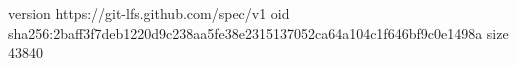 version https://git-lfs.github.com/spec/v1
oid sha256:2baff3f7deb1220d9c238aa5fe38e2315137052ca64a104c1f646bf9c0e1498a
size 43840
